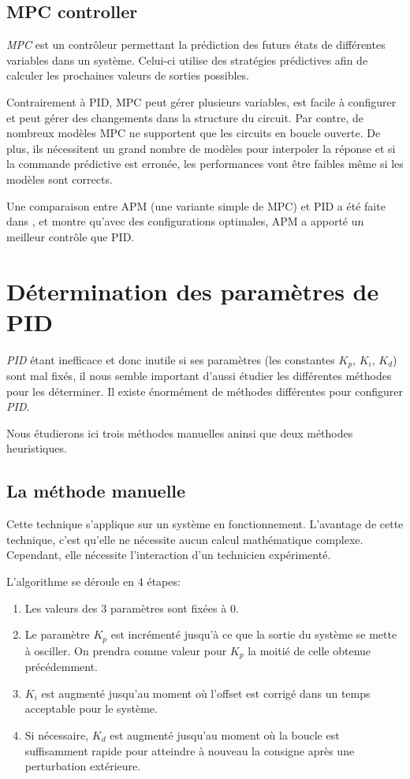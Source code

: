 \documentclass[a4paper,10pt]{report}
\begin{document}
\subsection{MPC controller}
\emph{MPC} est un contrôleur permettant la prédiction des futurs états de différentes variables dans un système.
Celui-ci utilise des stratégies prédictives afin de calculer les prochaines valeurs de sorties possibles.

Contrairement à PID, MPC peut gérer plusieurs variables, est facile à configurer et peut gérer des changements dans la structure du circuit.
Par contre, de nombreux modèles MPC ne supportent que les circuits en boucle ouverte.
De plus, ils nécessitent un grand nombre de modèles pour interpoler la réponse et si la commande prédictive est erronée, les performances vont être faibles même si les modèles sont corrects.

Une comparaison entre APM (une variante simple de MPC) et PID a été faite dans \cite{saletovic2014apm}, et montre qu'avec des configurations optimales, APM a apporté un meilleur contrôle que PID.

\section{Détermination des paramètres de PID}

\emph{PID} étant inefficace et donc inutile si ses paramètres (les constantes $K_p$, $K_i$, $K_d$) sont mal fixés, il nous semble important d'aussi étudier les différentes méthodes pour les déterminer. Il existe énormément de méthodes différentes pour configurer \emph{PID}.

Nous étudierons ici trois méthodes manuelles aninsi que deux méthodes heuristiques.


\subsection{La méthode manuelle}
Cette technique s'applique sur un système en fonctionnement.
L'avantage de cette technique, c'est qu'elle ne nécessite aucun calcul mathématique complexe.
Cependant, elle nécessite l'interaction d'un technicien expérimenté.

L'algorithme se déroule en 4 étapes:
\begin{enumerate}
    \item Les valeurs des 3 paramètres sont fixées à $0$.
    \item Le paramètre $K_p$ est incrémenté jusqu'à ce que la sortie du système se mette à osciller.
    On prendra comme valeur pour $K_p$ la moitié de celle obtenue précédemment.
    \item $K_i$ est augmenté jusqu'au moment où l'offset est corrigé dans un temps acceptable pour le système.
    \item Si nécessaire, $K_d$ est augmenté jusqu'au moment où la boucle est suffisamment rapide pour atteindre à nouveau la consigne après une perturbation extérieure.
\end{enumerate}
\end{document}
